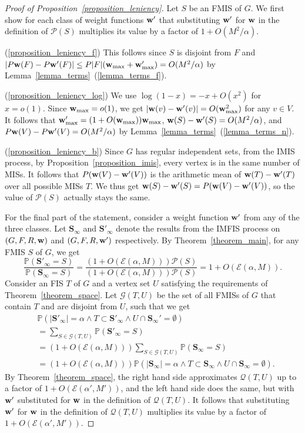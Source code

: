 \documentclass{article}
\theoremstyle{plain}
\theoremstyle{remark}
\theoremstyle{plain}
\numberwithin{equation}{section}
\renewcommand{\b}{{\bf{w}}}
\begin{document}
	\begin{proof}[Proof of Proposition~\ref{proposition_leniency}]
		Let $S$ be an FMIS of $G$. We first show for each class of weight functions $\b'$ that substituting $\b'$ for $\b$ in the definition of $\mathscr{P}(S)$ multiplies its value by a factor of $1+O(M^2/\alpha)$.
		
		(\ref{proposition_leniency_f}) This follows since $S$ is disjoint from $F$ and $|P\b(F)-P\b'(F)|\leq P|F|(\b_{\max}+\b'_{\max})=O(M^2/\alpha)$ by Lemma~\ref{lemma_terms}~(\ref{lemma_terms_f}).
		
		(\ref{proposition_leniency_log}) We use $\log(1-x)=-x+O(x^2)$ for $x=o(1)$. Since $\b_{\max}=o(1)$, we get $|\b(v)-\b'(v)|=O(\b_{\max}^2)$ for any $v\in V$. It follows that $\b'_{\max}=(1+O(\b_{\max}))\b_{\max}$, $\b(S)-\b'(S)=O(M^2/\alpha)$, and $P\b(V)-P\b'(V)=O(M^2/\alpha)$ by Lemma~\ref{lemma_terms}~(\ref{lemma_terms_n}).
		
		(\ref{proposition_leniency_b}) Since $G$ has regular independent sets, from the IMIS process, by Proposition~\ref{proposition_imis}, every vertex is in the same number of MISs. It follows that $P(\b(V)-\b'(V))$ is the arithmetic mean of $\b(T)-\b'(T)$ over all possible MISs $T$. We thus get $\b(S)-\b'(S)=P(\b(V)-\b'(V))$, so the value of $\mathscr{P}(S)$ actually stays the same.
		
		For the final part of the statement, consider a weight function $\b'$ from any of the three classes. Let $\boldsymbol{S}_{\infty}$ and $\boldsymbol{S}'_{\infty}$ denote the results from the IMFIS process on $(G,F,R,\b)$ and $(G,F,R,\b')$ respectively. By Theorem~\ref{theorem_main}, for any FMIS $S$ of $G$, we get $$\frac{\mathbb{P}(\boldsymbol{S}'_{\infty}=S)}{\mathbb{P}(\boldsymbol{S}_{\infty}=S)}=\frac{(1+O(\mathscr{E}(\alpha,M)))\mathscr{P}(S)}{(1+O(\mathscr{E}(\alpha,M)))\mathscr{P}(S)}=1+O(\mathscr{E}(\alpha,M)).$$ Consider an FIS $T$ of $G$ and a vertex set $U$ satisfying the requirements of Theorem~\ref{theorem_space}. Let $\mathcal{G}(T,U)$ be the set of all FMISs of $G$ that contain $T$ and are disjoint from $U$, such that we get
		\begin{align}
			&\mathbb{P}(|\boldsymbol{S}'_{\infty}|=\alpha\wedge T\subset\boldsymbol{S}'_{\infty}\wedge U\cap\boldsymbol{S}_{\infty}'=\emptyset)
			\\&=\sum_{S\in\mathcal{G}(T,U)}\mathbb{P}(\boldsymbol{S}'_{\infty}=S)
			\\&=(1+O(\mathscr{E}(\alpha,M)))\sum_{S\in\mathcal{G}(T,U)}\mathbb{P}(\boldsymbol{S}_{\infty}=S)
			\\&=(1+O(\mathscr{E}(\alpha,M)))\mathbb{P}(|\boldsymbol{S}_{\infty}|=\alpha\wedge T\subset\boldsymbol{S}_{\infty}\wedge U\cap\boldsymbol{S}_{\infty}=\emptyset).
		\end{align}
		By Theorem~\ref{theorem_space}, the right hand side approximates $\mathscr{Q}(T,U)$ up to a factor of $1+O(\mathscr{E}(\alpha',M'))$, and the left hand side does the same, but with $\b'$ substituted for $\b$ in the definition of $\mathscr{Q}(T,U)$. It follows that substituting $\b'$ for $\b$ in the definition of $\mathscr{Q}(T,U)$ multiplies its value by a factor of $1+O(\mathscr{E}(\alpha',M'))$.
	\end{proof}
	
\end{document}
